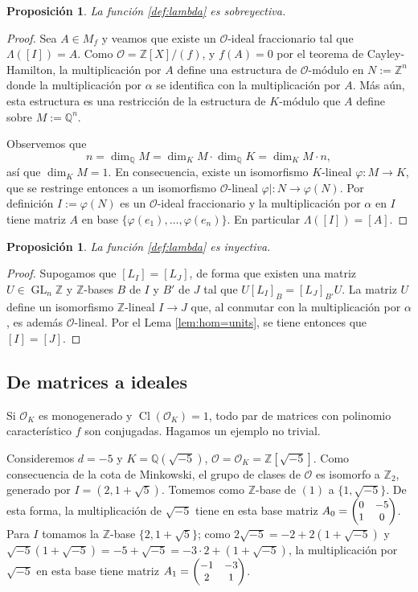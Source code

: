 \documentclass[11pt,a4paper]{amsart}
\newcommand{\Q}{\mathbb{Q}}
\newcommand{\Z}{\mathbb{Z}}
\DeclareMathOperator{\GL}{GL}
\DeclareMathOperator{\CL}{Cl}
\numberwithin{equation}{section}
\theoremstyle{plain}
\newtheorem{prop}[equation]{Proposición}
\renewcommand{\O}{\mathcal{O}}
\begin{document}
\begin{prop} La función \eqref{def:lambda} es sobreyectiva.
\end{prop}
\begin{proof} Sea $A \in M_f$ y veamos que existe un $\O$-ideal
fraccionario tal que $\Lambda([I]) = A$. Como $\O = \Z[X]/(f)$,
y $f(A) = 0$ por el teorema de Cayley-Hamilton,
la multiplicación por $A$ define una estructura de $\O$-módulo
en $N:= \Z^n$ donde la multiplicación por $\alpha$ se identifica con
la multiplicación por $A$. Más aún, esta estructura
es una restricción de la estructura
de $K$-módulo que $A$ define sobre $M := \Q^n$.

Observemos que
\[
n = \dim_{\Q} M = \dim_K M \cdot \dim_\Q K = \dim_K M \cdot n,
\]
así que $\dim_K M = 1$. En consecuencia, existe un isomorfismo
$K$-lineal $\varphi \colon M \to K$, que se restringe
entonces a un isomorfismo $\O$-lineal $\varphi| \colon N \to \varphi(N)$.
Por definición $I := \varphi(N)$ es un $\O$-ideal fraccionario y
la multiplicación por $\alpha$ en $I$ tiene matriz $A$ en base
$\{\varphi(e_1), \ldots, \varphi(e_n)\}$. En particular
$\Lambda([I]) = [A]$.
\end{proof}

\begin{prop} La función \eqref{def:lambda} es inyectiva. \label{prop:lambda-mono}
\end{prop}
\begin{proof} Supogamos que $[L_I] = [L_J]$, de forma que existen
una matriz $U \in \GL_n \Z$ y $\Z$-bases $B$ de $I$ y $B'$ de $J$
tal que $U [L_I]_{B} = [L_J]_{B'} U$. La matriz $U$ define
un isomorfismo $\Z$-lineal $I \to J$ que, al conmutar con la multiplicación
por $\alpha$, es además $\O$-lineal. Por el Lema \ref{lem:hom=units},
se tiene entonces que $[I] = [J]$.
\end{proof}

\subsection{De matrices a ideales} Si $\O_K$ es monogenerado
y $\CL(\O_K) = 1$, todo par de matrices con polinomio característico
$f$ son conjugadas. Hagamos un ejemplo no trivial.

Consideremos $d = -5$ y $K = \Q(\sqrt{-5})$, $\O = \O_K = \Z[\sqrt{-5}]$.
Como consecuencia de la cota de Minkowski,
el grupo de clases de $\O$ es isomorfo a $\Z_2$, generado por
$I = (2,1+\sqrt{5})$. Tomemos como $\Z$-base de $(1)$ a
$\{1,\sqrt{-5}\}$. De esta forma, la multiplicación de $\sqrt{-5}$
tiene en esta base matriz $A_0 =
\small\begin{pmatrix}0 & -5\\ 1 & 0\end{pmatrix}$.
Para $I$ tomamos la $\Z$-base $\{2,1+\sqrt{5}\}$;
como $2\sqrt{-5} = -2 + 2(1+\sqrt{-5})$ y $\sqrt{-5}(1+\sqrt{-5}) = -5 +
\sqrt{-5} = -3 \cdot 2 + (1+\sqrt{-5})$, la multiplicación
por $\sqrt{-5}$ en esta base tiene matriz $A_1 = \small\begin{pmatrix}
-1 & -3\\ 2 & 1 \end{pmatrix}$.
\end{document}
